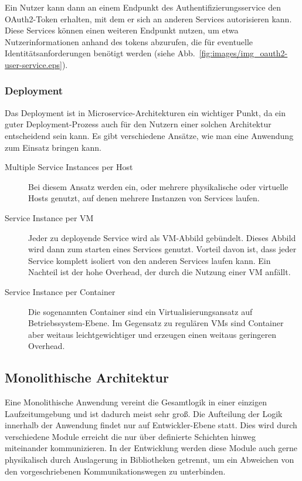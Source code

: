 \documentclass[12pt,a4paper,bibliography=totocnumbered,listof=totocnumbered]{scrartcl}
\begin{document}
Ein Nutzer kann dann an einem Endpunkt des Authentifizierungsservice den OAuth2-Token erhalten, mit dem er sich an anderen Services autorisieren kann. Diese Services können einen weiteren Endpunkt nutzen, um etwa Nutzerinformationen anhand des tokens abzurufen, die für eventuelle Identitätsanforderungen benötigt werden (siehe Abb.~\ref{fig:images/img_oauth2-user-service.eps}).


\subsubsection{Deployment}

Das Deployment ist in Microservice-Architekturen ein wichtiger Punkt, da ein guter Deployment-Prozess auch für den Nutzern einer solchen Architektur entscheidend sein kann. Es gibt verschiedene Ansätze, wie man eine Anwendung zum Einsatz bringen kann\cite{richardsondeploy}.

\begin{description}
	\item[Multiple Service Instances per Host] Bei diesem Ansatz werden ein, oder mehrere physikalische oder virtuelle Hosts genutzt, auf denen mehrere Instanzen von Services laufen.
	
	\item[Service Instance per \ac{VM}] Jeder zu deployende Service wird als \ac{VM}-Abbild gebündelt. Dieses Abbild wird dann zum starten eines Services genutzt. Vorteil davon ist, dass jeder Service komplett isoliert von den anderen Services laufen kann. Ein Nachteil ist der hohe Overhead, der durch die Nutzung einer \ac{VM} anfällt.
	
	\item[Service Instance per Container] Die sogenannten Container sind ein Virtualisierungsansatz auf Betriebssystem-Ebene. Im Gegensatz zu regulären \acp{VM} sind Container aber weitaus leichtgewichtiger und erzeugen einen weitaus geringeren Overhead.
\end{description}

\subsection{Monolithische Architektur}\label{ch:mon-arch}

Eine Monolithische Anwendung vereint die Gesamtlogik in einer einzigen Laufzeitumgebung und ist dadurch meist sehr groß. Die Aufteilung der Logik innerhalb der Anwendung findet nur auf Entwickler-Ebene statt. Dies wird durch verschiedene Module erreicht die nur über definierte Schichten hinweg miteinander kommunizieren. In der Entwicklung werden diese Module auch gerne physikalisch durch Auslagerung in Bibliotheken getrennt, um ein Abweichen von den vorgeschriebenen Kommunikationswegen zu unterbinden.
\end{document}
